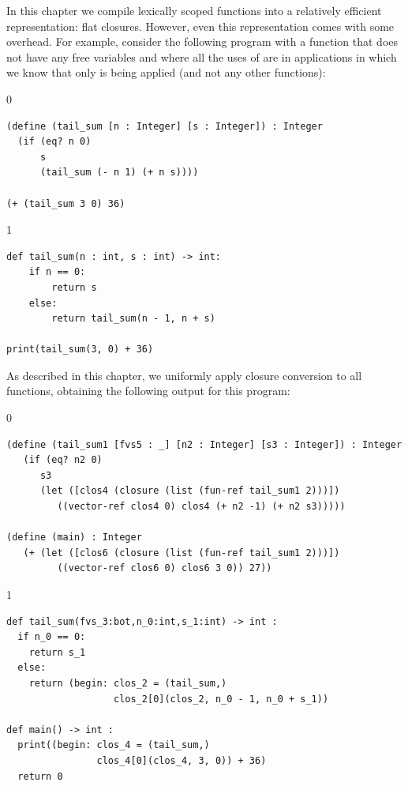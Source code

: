 \documentclass[7x10]{TimesAPriori_MIT}%
\def\racketEd{0}
\def\pythonEd{1}
\def\edition{1}
\newcommand{\pythonColor}[0]{}
\numberwithin{theorem}{chapter}
\numberwithin{definition}{chapter}
\numberwithin{equation}{chapter}
\begin{document}
In this chapter we compile lexically scoped functions into a
relatively efficient representation: flat closures. However, even this
representation comes with some overhead. For example, consider the
following program with a function  that does not have
any free variables and where all the uses of  are in
applications in which we know that only  is being applied
(and not any other functions):
\begin{center}
\begin{minipage}{0.95\textwidth}
{\if\edition\racketEd  
\begin{lstlisting}
(define (tail_sum [n : Integer] [s : Integer]) : Integer
  (if (eq? n 0)
      s
      (tail_sum (- n 1) (+ n s))))

(+ (tail_sum 3 0) 36)
\end{lstlisting}
\fi}
{\if\edition\pythonEd\pythonColor
\begin{lstlisting}
def tail_sum(n : int, s : int) -> int:
    if n == 0:
        return s
    else:
        return tail_sum(n - 1, n + s)

print(tail_sum(3, 0) + 36)
\end{lstlisting}
\fi}
\end{minipage}
\end{center}
As described in this chapter, we uniformly apply closure conversion to
all functions, obtaining the following output for this program:
\begin{center}
\begin{minipage}{0.95\textwidth}
{\if\edition\racketEd  
\begin{lstlisting}
(define (tail_sum1 [fvs5 : _] [n2 : Integer] [s3 : Integer]) : Integer
   (if (eq? n2 0)
      s3
      (let ([clos4 (closure (list (fun-ref tail_sum1 2)))])
         ((vector-ref clos4 0) clos4 (+ n2 -1) (+ n2 s3)))))

(define (main) : Integer
   (+ (let ([clos6 (closure (list (fun-ref tail_sum1 2)))])
         ((vector-ref clos6 0) clos6 3 0)) 27))
\end{lstlisting}
\fi}
{\if\edition\pythonEd\pythonColor
\begin{lstlisting}
def tail_sum(fvs_3:bot,n_0:int,s_1:int) -> int :
  if n_0 == 0:
    return s_1
  else:
    return (begin: clos_2 = (tail_sum,)
                   clos_2[0](clos_2, n_0 - 1, n_0 + s_1))

def main() -> int :
  print((begin: clos_4 = (tail_sum,)
                clos_4[0](clos_4, 3, 0)) + 36)
  return 0
\end{lstlisting}
\fi}
\end{minipage}
\end{center}
\end{document}
